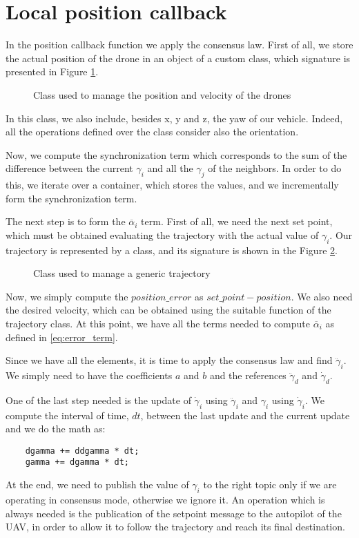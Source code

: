 \section{Local position callback\label{sec:local_position_callback}}

In the position callback function we apply the consensus law. First of all, we
store the actual position of the drone in an object of a custom class,
which signature is presented in Figure \ref{fig:drone_pose}.
\begin{figure}
\centering
  
\caption{Class used to manage the position and velocity of the drones}
\label{fig:drone_pose}
\end{figure}
In this class, we also include, besides x, y and z, the yaw of our vehicle. Indeed,
all the operations defined over the class consider also the orientation.

Now, we compute the synchronization term which corresponds to the sum of the
difference between the current $\gamma_i$ and all the $\gamma_j$ of the neighbors.
In order to do this, we iterate over a container, which stores the values, and
we incrementally form the synchronization term.

The next step is to form the $\overline{\alpha}_i$ term.
First of all, we need the next set point, which must be obtained evaluating
the trajectory with the actual value of $\gamma_i$.
Our trajectory is represented by a class, and its signature is shown in the Figure
\ref{fig:loc_pos_callback_trajectory}.
\begin{figure}
\centering
  
\caption{Class used to manage a generic trajectory}
\label{fig:loc_pos_callback_trajectory}
\end{figure}
Now, we simply compute the $position\_error$ as $set\_point - position$.
We also need the desired velocity, which can be obtained using the suitable function
of the trajectory class.
At this point, we have all the terms needed to compute $\overline{\alpha}_i$
as defined in \ref{eq:error_term}.

Since we have all the elements, it is time to apply the consensus law and find
$\ddot{\gamma}_i$. We simply need to have the coefficients $a$ and $b$
and the references $\ddot{\gamma}_d$ and $\dot{\gamma}_d$.

One of the last step needed is the update of $\dot{\gamma}_i$ using $\ddot{\gamma}_i$
and $\gamma_i$ using $\dot{\gamma}_i$. We compute the interval of time, $dt$, between the
last update and the current update and we do the math as:
\begin{lstlisting}
    dgamma += ddgamma * dt;
    gamma += dgamma * dt;
\end{lstlisting}

At the end, we need to publish the value of $\gamma_i$ to the right topic only
if we are operating in consensus mode, otherwise we ignore it. An operation which is
always needed is the publication of the setpoint message to the autopilot of
the UAV, in order to allow it to follow the trajectory and reach its final destination.
